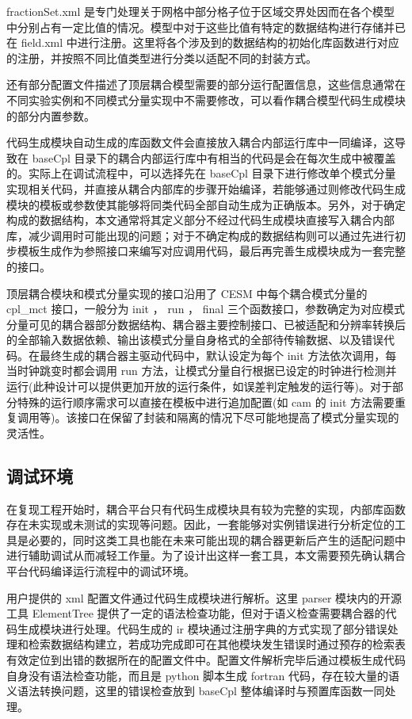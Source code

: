 fractionSet.xml 是专门处理关于网格中部分格子位于区域交界处因而在各个模型中分别占有一定比值的情况。模型中对于这些比值有特定的数据结构进行存储并已在 field.xml 中进行注册。这里将各个涉及到的数据结构的初始化库函数进行对应的注册，并按照不同比值类型进行分类以适配不同的封装方式。

还有部分配置文件描述了顶层耦合模型需要的部分运行配置信息，这些信息通常在不同实验实例和不同模式分量实现中不需要修改，可以看作耦合模型代码生成模块的部分内置参数。

代码生成模块自动生成的库函数文件会直接放入耦合内部运行库中一同编译，这导致在 baseCpl 目录下的耦合内部运行库中有相当的代码是会在每次生成中被覆盖的。实际上在调试流程中，可以选择先在 baseCpl 目录下进行修改单个模式分量实现相关代码，并直接从耦合内部库的步骤开始编译，若能够通过则修改代码生成模块的模板或参数使其能够将同类代码全部自动生成为正确版本。另外，对于确定构成的数据结构，本文通常将其定义部分不经过代码生成模块直接写入耦合内部库，减少调用时可能出现的问题；对于不确定构成的数据结构则可以通过先进行初步模板生成作为参照接口来编写对应调用代码，最后再完善生成模块成为一套完整的接口。

顶层耦合模块和模式分量实现的接口沿用了 CESM 中每个耦合模式分量的 cpl\_mct 接口，一般分为 init ， run ， final 三个函数接口，参数确定为对应模式分量可见的耦合器部分数据结构、耦合器主要控制接口、已被适配和分辨率转换后的全部输入数据依赖、输出该模式分量自身格式的全部待传输数据、以及错误代码。在最终生成的耦合器主驱动代码中，默认设定为每个 init 方法依次调用，每当时钟跳变时都会调用 run 方法，让模式分量自行根据已设定的时钟进行检测并运行(此种设计可以提供更加开放的运行条件，如误差判定触发的运行等)。对于部分特殊的运行顺序需求可以直接在模板中进行追加配置(如 cam 的 init 方法需要重复调用等)。该接口在保留了封装和隔离的情况下尽可能地提高了模式分量实现的灵活性。

\subsection{调试环境}

在复现工程开始时，耦合平台只有代码生成模块具有较为完整的实现，内部库函数存在未实现或未测试的实现等问题。因此，一套能够对实例错误进行分析定位的工具是必要的，同时这类工具也能在未来可能出现的耦合器更新后产生的适配问题中进行辅助调试从而减轻工作量。为了设计出这样一套工具，本文需要预先确认耦合平台代码编译运行流程中的调试环境。

用户提供的 xml 配置文件通过代码生成模块进行解析。这里 parser 模块内的开源工具 ElementTree 提供了一定的语法检查功能，但对于语义检查需要耦合器的代码生成模块进行处理。代码生成的 ir 模块通过注册字典的方式实现了部分错误处理和检索数据结构建立，若成功完成即可在其他模块发生错误时通过预存的检索表有效定位到出错的数据所在的配置文件中。配置文件解析完毕后通过模板生成代码自身没有语法检查功能，而且是 python 脚本生成 fortran 代码，存在较大量的语义语法转换问题，这里的错误检查放到 baseCpl 整体编译时与预置库函数一同处理。

